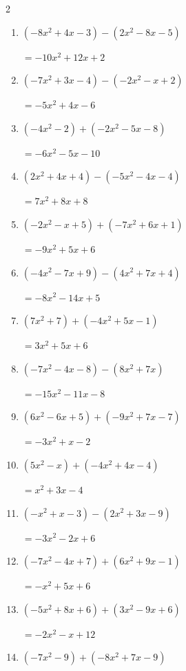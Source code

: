 \begin{multicols}{2}
\begin{enumerate}
        $=-x^{2}+4x-1$

  \item $(-8x^{2}+4x-3)-(2x^{2}-8x-5)$

        $=-10x^{2}+12x+2$

  \item $(-7x^{2}+3x-4)-(-2x^{2}-x+2)$

        $=-5x^{2}+4x-6$

  \item $(-4x^{2}-2)+(-2x^{2}-5x-8)$

        $=-6x^{2}-5x-10$

  \item $(2x^{2}+4x+4)-(-5x^{2}-4x-4)$

        $=7x^{2}+8x+8$

  \item $(-2x^{2}-x+5)+(-7x^{2}+6x+1)$

        $=-9x^{2}+5x+6$

  \item $(-4x^{2}-7x+9)-(4x^{2}+7x+4)$

        $=-8x^{2}-14x+5$

  \item $(7x^{2}+7)+(-4x^{2}+5x-1)$

        $=3x^{2}+5x+6$

  \item $(-7x^{2}-4x-8)-(8x^{2}+7x)$

        $=-15x^{2}-11x-8$

  \item $(6x^{2}-6x+5)+(-9x^{2}+7x-7)$

        $=-3x^{2}+x-2$

  \item $(5x^{2}-x)+(-4x^{2}+4x-4)$

        $=x^{2}+3x-4$

  \item $(-x^{2}+x-3)-(2x^{2}+3x-9)$

        $=-3x^{2}-2x+6$

  \item $(-7x^{2}-4x+7)+(6x^{2}+9x-1)$

        $=-x^{2}+5x+6$

\columnbreak %

\resetques

  \item $(-5x^{2}+8x+6)+(3x^{2}-9x+6)$

        $=-2x^{2}-x+12$

  \item $(-7x^{2}-9)+(-8x^{2}+7x-9)$


\end{enumerate}
\end{multicols}
